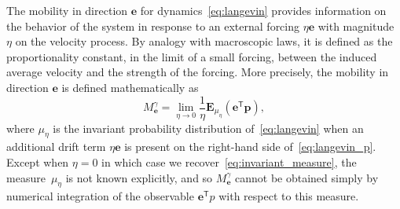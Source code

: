 \documentclass[11pt,a4paper]{article}
\newcommand{\expect}[0]{\mathbf{E}}
\newcommand{\real}{\mathbf R}
\newcommand{\vect}[1]{\boldsymbol{\mathbf #1}}
\newcommand{\mat}[1]{\vect #1}
\renewcommand{\t}{\mathsf T}
\theoremstyle{plain}
\numberwithin{equation}{section}
\begin{document}
The mobility in direction $\vect e$ for dynamics~\eqref{eq:langevin} provides information on the behavior of the system
in response to an external forcing $\eta \vect e$ with magnitude~$\eta$ on the velocity process.
By analogy with macroscopic laws,
it is defined as the proportionality constant,
in the limit of a small forcing,
between the induced average velocity and the strength  of the forcing.
More precisely,
the mobility in direction $\vect e$ is defined mathematically as
\begin{equation}
    \label{eq:relation_mobility_diffusion}
    M^{\gamma}_{\vect e} =  \lim_{\eta \to 0} \frac{1}{\eta}\expect_{\mu_{\eta}} (\vect e^\t \vect p) ,
\end{equation}
where $\mu_{\eta}$ is the invariant probability distribution of~\eqref{eq:langevin} when
an additional drift term $\eta \vect e$ is present on the right-hand side of~\eqref{eq:langevin_p}.
Except when $\eta = 0$ in which case we recover~\eqref{eq:invariant_measure},
the measure~$\mu_{\eta}$ is not known explicitly,
and so $M_{\vect e}^{\gamma}$ cannot be obtained simply by numerical integration of the observable $\vect e^\t p$ with respect to this measure.
\end{document}
